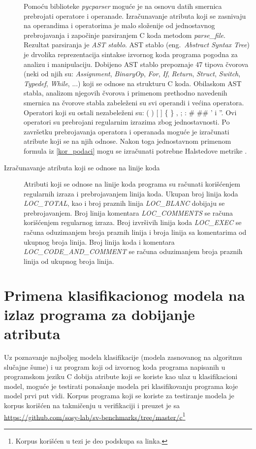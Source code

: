 \documentclass[12pt,oneside]{memoir}
\begin{document}
\begin{description}
Pomoću biblioteke \textit{pycparser} moguće je na osnovu datih smernica prebrojati operatore i operanade. Izračunavanje atributa koji se zasnivaju na operandima i operatorima je malo složenije od jednostavnog prebrojavanja i započinje parsiranjem C koda metodom \textit{parse\_file}. Rezultat parsiranja je \textit{AST stablo}. AST stablo (eng.~\textit{Abstract Syntax Tree}) je drvolika reprezentacija sintakse izvornog koda programa pogodna za analizu i manipulaciju. Dobijeno AST stablo prepoznaje 47 tipova čvorova (neki od njih su: \textit{Assignment}, \textit{BinaryOp}, \textit{For}, \textit{If}, \textit{Return}, \textit{Struct}, \textit{Switch}, \textit{Typedef}, \textit{While}, ...) koji se odnose na strukturu C koda. Obilaskom AST stabla, analizom njegovih čvorova i primenom prethodno navedenih smernica na čvorove stabla zabeleženi su svi operandi i većina operatora. Operatori koji su ostali nezabeleženi su: ( ) [ ] \{ \} , ; : \# \#\# ' i ''. Ovi operatori su prebrojani regularnim izrazima zbog jednostavnosti. Po završetku prebrojavanja operatora i operanada moguće je izračunati atribute koji se na njih odnose. Nakon toga jednostavnom primenom formula iz \ref{kor_podaci} mogu se izračunati potrebne Halstedove metrike \cite{pycparser}.

\item[Izračunavanje atributa koji se odnose na linije koda]

Atributi koji se odnose na linije koda programa su računati korišćenjem regularnih izraza i prebrojavanjem linija koda. Ukupan broj linija koda \textit{LOC\_TOTAL}, kao i broj praznih linija \textit{LOC\_BLANC} dobijaju se prebrojavanjem. Broj linija komentara \textit{LOC\_COMMENTS} se računa korišćenjem regularnog izraza. Broj izvršivih linija koda \textit{LOC\_EXEC} se računa oduzimanjem broja praznih linija i broja linija sa komentarima od ukupnog broja linija. Broj linija koda i komentara \textit{LOC\_CODE\_AND\_COMMENT} se računa oduzimanjem broja praznih linija od ukupnog broja linija.


\end{description}

\section{Primena klasifikacionog modela na izlaz programa za dobijanje atributa}

Uz poznavanje najboljeg modela klasifikacije (modela zasnovanog na algoritmu slučajne šume) i uz program koji od izvornog koda programa napisanih u programskom jeziku C dobija atribute koji se koriste kao ulaz u klasifikacioni model, moguće je testirati ponašanje modela pri klasifikovanju programa koje model prvi put vidi. Korpus programa koji se koriste za testiranje modela je korpus korišćen na takmičenju u verifikaciji i preuzet je sa \url{https://github.com/sosy-lab/sv-benchmarks/tree/master/c}\footnote{Korpus korišćen u tezi je deo podskupa sa linka.}
\end{document}
